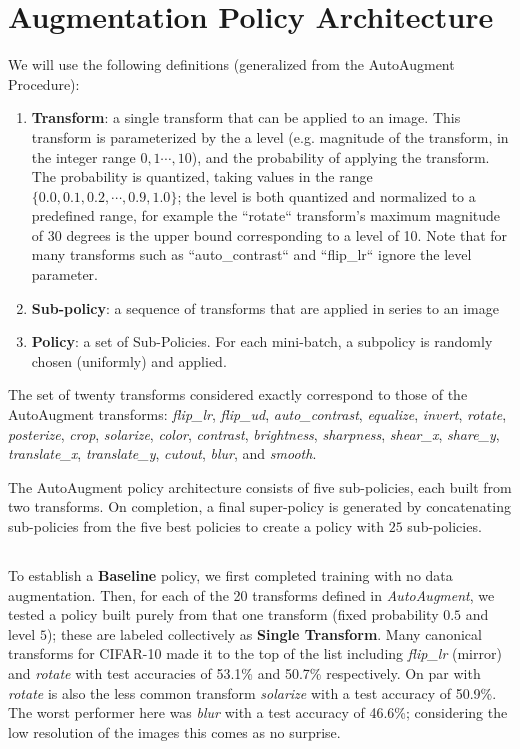 \documentclass[10pt,twocolumn,letterpaper]{article}
\begin{document}
\section{Augmentation Policy Architecture}
We will use the following definitions (generalized from the AutoAugment Procedure):

\begin{enumerate}

\item[] \textbf{Transform}: a single transform that can be applied to an image. This transform is parameterized by the a level (e.g. magnitude of the transform, in the integer range $0,1 \cdots, 10$), and the probability of applying the transform. The probability is quantized, taking values in the range $\{0.0, 0.1, 0.2, \cdots, 0.9, 1.0\}$; the level is both quantized and normalized to a predefined range, for example the ``rotate`` transform's maximum magnitude of $30$ degrees is the upper bound corresponding to a level of 10. Note that for many transforms such as ``auto\_contrast`` and ``flip\_lr`` ignore the level parameter.
\item[] \textbf{Sub-policy}: a sequence of transforms that are applied in series to an image
\item[] \textbf{Policy}: a set of Sub-Policies. For each mini-batch, a subpolicy is randomly chosen (uniformly) and applied.
\end{enumerate}

The set of twenty transforms considered exactly correspond to those of the AutoAugment transforms: \textit{flip\_lr}, \textit{flip\_ud}, \textit{auto\_contrast}, \textit{equalize}, \textit{invert}, \textit{rotate}, \textit{posterize}, \textit{crop}, \textit{solarize}, \textit{color}, \textit{contrast}, \textit{brightness}, \textit{sharpness}, \textit{shear\_x}, \textit{share\_y}, \textit{translate\_x}, \textit{translate\_y}, \textit{cutout}, \textit{blur}, and \textit{smooth}. 

The AutoAugment policy architecture consists of five sub-policies, each built from two transforms. On completion, a final super-policy is generated by concatenating sub-policies from the five best policies to create a policy with $25$ sub-policies.

\subsection{}

To establish a \textbf{Baseline} policy, we first completed training with no data augmentation. Then, for each of the 20 transforms defined in \textit{AutoAugment}, we tested a policy built purely from that one transform (fixed probability $0.5$ and level $5$); these are labeled collectively as \textbf{Single Transform}. Many canonical transforms for CIFAR-10 made it to the top of the list including \textit{flip\_lr} (mirror) and \textit{rotate} with test accuracies of 53.1\% and 50.7\% respectively. On par with \textit{rotate} is also the less common transform \textit{solarize} with a test accuracy of 50.9\%. The worst performer here was \textit{blur} with a test accuracy of 46.6\%; considering the low resolution of the images this comes as no surprise.
\end{document}
